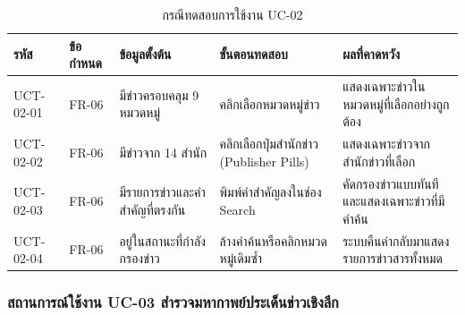 \begin{table}[H]
\centering
\caption{กรณีทดสอบการใช้งาน UC-02}
\label{tab_uct_uc02}
\renewcommand{\arraystretch}{0.85}

\begin{tabularx}{\textwidth}{|C{1.8cm}|C{1.2cm}|L{3.0cm}|Y|Y|}
\hline
\textbf{รหัส} & \textbf{ข้อกำหนด} & \textbf{ข้อมูลตั้งต้น} & \textbf{ขั้นตอนทดสอบ} & \textbf{ผลที่คาดหวัง} \\ \hline
UCT-02-01 & FR-06 & มีข่าวครอบคลุม 9 หมวดหมู่ & คลิกเลือกหมวดหมู่ข่าว & แสดงเฉพาะข่าวในหมวดหมู่ที่เลือกอย่างถูกต้อง \\ \hline
UCT-02-02 & FR-06 & มีข่าวจาก 14 สำนัก & คลิกเลือกปุ่มสำนักข่าว (Publisher Pills) & แสดงเฉพาะข่าวจากสำนักข่าวที่เลือก \\ \hline
UCT-02-03 & FR-06 & มีรายการข่าวและคำสำคัญที่ตรงกัน & พิมพ์คำสำคัญลงในช่อง Search & คัดกรองข่าวแบบทันทีและแสดงเฉพาะข่าวที่มีคำค้น \\ \hline
UCT-02-04 & FR-06 & อยู่ในสถานะที่กำลังกรองข่าว & ล้างคำค้นหรือคลิกหมวดหมู่เดิมซ้ำ & ระบบคืนค่ากลับมาแสดงรายการข่าวสารทั้งหมด \\ \hline
\end{tabularx}
\end{table}

\clearpage
\subsubsection{สถานการณ์ใช้งาน UC-03 สำรวจมหากาพย์ประเด็นข่าวเชิงลึก}

